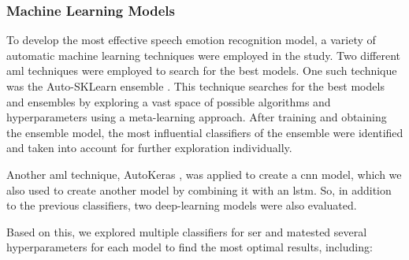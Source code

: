 \subsubsection{Machine Learning Models}

To develop the most effective speech emotion recognition model, a variety of automatic machine learning techniques were employed in the study. Two different \ac{aml} techniques were employed to search for the best models. One such technique was the Auto-SKLearn ensemble \cite{feurerneurips15a}. This technique searches for the best models and ensembles by exploring a vast space of possible algorithms and hyperparameters using a meta-learning approach. After training and obtaining the ensemble model, the most influential classifiers of the ensemble were identified and taken into account for further exploration individually.

Another \ac{aml} technique, AutoKeras \cite{jin2019auto}, was applied to create a \ac{cnn} model, which we also used to create another model by combining it with an \ac{lstm}. So, in addition to the previous classifiers, two deep-learning models were also evaluated.

Based on this, we explored multiple classifiers for \ac{ser} and matested several hyperparameters for each model to find the most optimal results, including:

